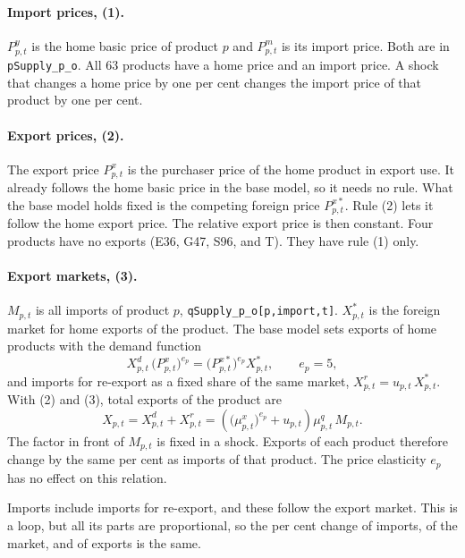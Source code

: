 \documentclass[11pt,a4paper]{article}
\newcommand{\code}[1]{\texttt{#1}}
\begin{document}
\paragraph{Import prices, (1).}
$P^{y}_{p,t}$ is the home basic price of product $p$ and $P^{m}_{p,t}$ is its import price. Both are in \code{pSupply\_p\_o}.
All 63 products have a home price and an import price.
A shock that changes a home price by one per cent changes the import price of that product by one per cent.

\paragraph{Export prices, (2).}
The export price $P^{x}_{p,t}$ is the purchaser price of the home product in export use. It already follows the home basic price in the base model, so it needs no rule.
What the base model holds fixed is the competing foreign price $P^{x*}_{p,t}$. Rule (2) lets it follow the home export price. The relative export price is then constant.
Four products have no exports (E36, G47, S96, and T). They have rule (1) only.

\paragraph{Export markets, (3).}
$M_{p,t}$ is all imports of product $p$, \code{qSupply\_p\_o[p,import,t]}. $X^{*}_{p,t}$ is the foreign market for home exports of the product.
The base model sets exports of home products with the demand function
\begin{equation}
X^{d}_{p,t}\, \bigl( P^{x}_{p,t} \bigr)^{e_p} = \bigl( P^{x*}_{p,t} \bigr)^{e_p} X^{*}_{p,t} , \qquad e_p = 5 ,
\label{eq:armington}
\end{equation}
and imports for re-export as a fixed share of the same market, $X^{r}_{p,t} = u_{p,t}\, X^{*}_{p,t}$.
With (2) and (3), total exports of the product are
\begin{equation}
X_{p,t} = X^{d}_{p,t} + X^{r}_{p,t} = \left( \bigl(\mu^{x}_{p,t}\bigr)^{e_p} + u_{p,t} \right) \mu^{q}_{p,t}\, M_{p,t} .
\label{eq:exports}
\end{equation}
The factor in front of $M_{p,t}$ is fixed in a shock. Exports of each product therefore change by the same per cent as imports of that product. The price elasticity $e_p$ has no effect on this relation.

Imports include imports for re-export, and these follow the export market. This is a loop, but all its parts are proportional, so the per cent change of imports, of the market, and of exports is the same.
\end{document}
